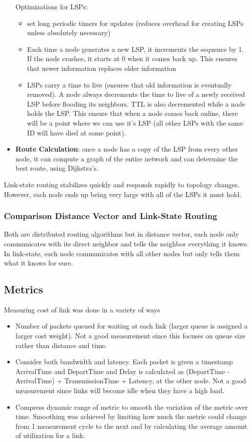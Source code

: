 \documentclass{article}
\begin{document}
\begin{itemize}
      Optimizations for LSPs:
      \begin{itemize}
        \item set long periodic timers for updates (reduces overhead for creating LSPs unless absolutely necessary)
        \item Each time a node generates a new LSP, it increments the sequence by 1. If the node crashes, it starts at 0 when it comes back up. This ensures that newer information replaces older information
        \item LSPs carry a time to live (ensures that old information is eventually removed). A node always decrements the time to live of a newly received LSP before flooding its neighbors. TTL is also decremented while a node holds the LSP. This ensure that when a node comes back online, there will be a point where we can use it's LSP (all other LSPs with the same ID will have died at some point).
      \end{itemize}
    \item \textbf{Route Calculation}: once a node has a copy of the LSP from every other node, it can compute a graph of the entire network and can determine the best route, using Dijkstra's.
  \end{itemize}
  Link-state routing stabilizes quickly and responds rapidly to topology changes. However, each node ends up being very large with all of the LSPs it must hold.
  \subsubsection{Comparison Distance Vector and Link-State Routing}
  Both are distributed routing algorithms but in distance vector, each node only communicates with its direct neighbor and tells the neighbor everything it knows. In link-state, each node communicates with all other nodes but only tells them what it knows for sure.
  \subsection{Metrics}
  Measuring cost of link was done in a variety of ways
  \begin{itemize}
    \item Number of packets queued for waiting at each link (larger queue is assigned a larger cost weight). Not a good measurement since this focuses on queue size rather than distance and time.
    \item Consider both bandwidth and latency. Each packet is given a timestamp ArrivalTime and DepartTime and Delay is calculated as (DepartTime - ArrivalTime) + TransmissionTime + Latency, at the other node. Not a good measurement since links will become idle when they have a high load.
    \item Compress dynamic range of metric to smooth the variation of the metric over time. Smoothing was achieved by limiting how much the metric could change from 1 measurement cycle to the next and by calculating the average amount of utilization for a link.
  \end{itemize}
\end{document}
